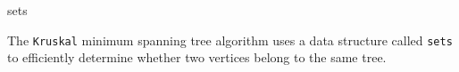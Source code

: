 \categorycontents{}
\newpage

\begin{algorithm}{sets}

\desc
The {\tt Kruskal} minimum spanning tree algorithm uses a data structure
called {\tt sets} to efficiently determine whether two vertices belong to
the same tree.
\end{algorithm}


\begin{sourceslandscape}
\end{sourceslandscape}
